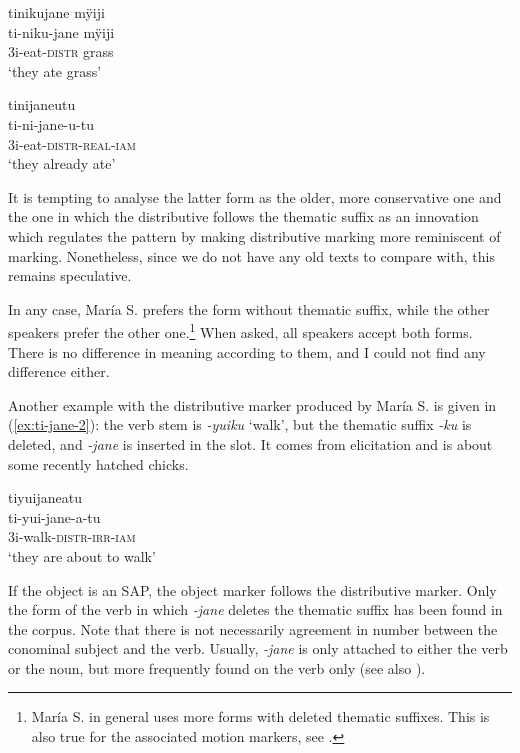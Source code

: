 \ea\label{ex:jane-eat-1}
\begingl
\glpreamble tinikujane mÿiji\\
\gla ti-niku-jane mÿiji\\
\glb 3i-eat-\textsc{distr} grass\\
\glft ‘they ate grass’\\ 
\endgl
\trailingcitation{[jxx-e150925l-1.115]}
\xe

\ea\label{ex:jane-eat-2}
\begingl
\glpreamble tinijaneutu\\
\gla ti-ni-jane-u-tu\\
\glb 3i-eat-\textsc{distr}-\textsc{real}-\textsc{iam}\\
\glft ‘they already ate’
\endgl
\trailingcitation{[rxx-e141230s.038]}
\xe

It is tempting to analyse the latter form as the older, more conservative one and the one in which the distributive follows the thematic suffix as an innovation which regulates the pattern by making distributive marking more reminiscent of  marking. Nonetheless, since we do not have any old texts to compare with, this remains speculative.

In any case, María S. prefers the form without thematic suffix, while the other speakers prefer the other one.\footnote{María S. in general uses more forms with deleted thematic suffixes. This is also true for the associated motion markers, see .} When asked, all speakers accept both forms. There is no difference in meaning according to them, and I could not find any difference either. 

Another example with the distributive marker produced by María S. is given in (\ref{ex:ti-jane-2}): the verb stem is \textit{-yuiku} ‘walk’, but the thematic suffix \textit{-ku} is deleted, and \textit{-jane} is inserted in the slot. It comes from elicitation and is about some recently hatched chicks.

\ea\label{ex:ti-jane-2}
\begingl 
\glpreamble tiyuijaneatu\\
\gla ti-yui-jane-a-tu\\ 
\glb 3i-walk-\textsc{distr}-\textsc{irr}-\textsc{iam}\\ 
\glft ‘they are about to walk’\\ 
\endgl
\trailingcitation{[rxx-e121128s-1.035]}
\xe


If the object is an SAP, the object marker follows the distributive marker. Only the form of the verb in which \textit{-jane} deletes the thematic suffix has been found in the corpus. Note that there is not necessarily agreement in number between the conominal subject and the verb. Usually, \textit{-jane} is only attached to either the verb or the noun, but more frequently found on the verb only (see also ). 


